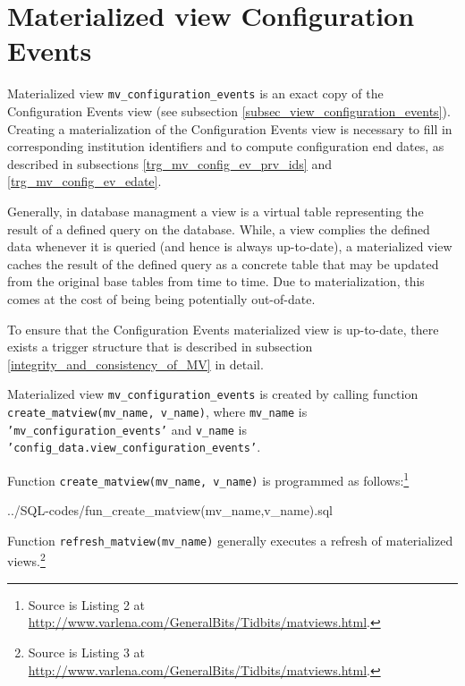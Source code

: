 \section{Materialized view Configuration Events}\label{sec_mview_configuration_events}

Materialized view \texttt{\footnotesize mv\_configuration\_events} is an exact copy of the Configuration Events view (see subsection \ref{subsec_view_configuration_events}).
Creating a materialization of the Configuration Events view is necessary to fill in corresponding institution identifiers and to compute configuration end dates, as described in subsections \ref{trg_mv_config_ev_prv_ids} and \ref{trg_mv_config_ev_edate}.  

Generally, in database managment a view is a virtual table representing the result of a defined query on the database.%
While, a view complies the defined data whenever it is queried (and hence is always up-to-date), a materialized view caches the result of the defined query as a concrete table that may be updated from the original base tables from time to time. Due to materialization, this comes at the cost of being being potentially out-of-date.

To ensure that the Configuration Events materialized view is up-to-date, there exists a trigger structure that is described in subsection \ref{integrity_and_consistency_of_MV} in detail. 

Materialized view \texttt{\footnotesize mv\_configuration\_events} is created by calling function \texttt{\footnotesize create\_matview(mv\_name, v\_name)}, where  \texttt{\footnotesize mv\_name} is  \texttt{\footnotesize 'mv\_configuration\_events'} and \texttt{\footnotesize v\_name}  is \texttt{\footnotesize 'config\_data.view\_configuration\_events'}.

Function \texttt{\footnotesize create\_matview(mv\_name, v\_name)} is programmed as follows:\footnote{Source is Listing 2 at \url{http://www.varlena.com/GeneralBits/Tidbits/matviews.html}.} 

%
{../SQL-codes/fun_create_matview(mv_name,v_name).sql}

Function \texttt{\footnotesize refresh\_matview(mv\_name)} generally executes a refresh of materialized views.\footnote{Source is Listing 3 at \url{http://www.varlena.com/GeneralBits/Tidbits/matviews.html}.} 

